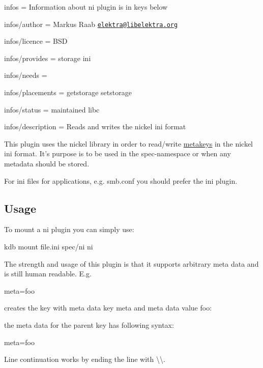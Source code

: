 
\begin{DoxyItemize}
\item infos = Information about ni plugin is in keys below
\item infos/author = Markus Raab \href{mailto:elektra@libelektra.org}{\tt elektra@libelektra.\+org}
\item infos/licence = B\+S\+D
\item infos/provides = storage ini
\item infos/needs =
\item infos/placements = getstorage setstorage
\item infos/status = maintained libc
\item infos/description = Reads and writes the nickel ini format
\end{DoxyItemize}

This plugin uses the nickel library in order to read/write \hyperlink{md_doc_help_elektra-meta-data_doc_help_elektra-meta-data_md}{metakeys} in the nickel ini format. It's purpose is to be used in the {\ttfamily spec}-\/namespace or when any metadata should be stored.

For ini files for applications, e.\+g. smb.\+conf you should prefer the ini plugin.

\subsection*{Usage}

To mount a ni plugin you can simply use\+: \begin{DoxyVerb}kdb mount file.ini spec/ni ni
\end{DoxyVerb}


The strength and usage of this plugin is that it supports arbitrary meta data and is still human readable. E.\+g. \begin{DoxyVerb}[key]
meta=foo
\end{DoxyVerb}


creates the key with meta data key {\ttfamily meta} and meta data value {\ttfamily foo}\+: 


the meta data for the parent key has following syntax\+: \begin{DoxyVerb}[]
meta=foo
\end{DoxyVerb}


Line continuation works by ending the line with {\ttfamily \textbackslash{}\textbackslash{}}.


